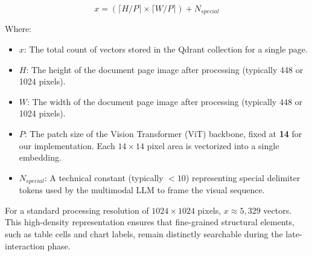 \begin{equation}
    x = \left( \lceil H / P \rceil \times \lceil W / P \rceil \right) + N_{special}
\end{equation}

Where:
\begin{itemize}
    \item \textbf{$x$}: The total count of vectors stored in the Qdrant collection for a single page.
    \item \textbf{$H$}: The height of the document page image after processing (typically 448 or 1024 pixels).
    \item \textbf{$W$}: The width of the document page image after processing (typically 448 or 1024 pixels).
    \item \textbf{$P$}: The patch size of the Vision Transformer (ViT) backbone, fixed at \textbf{14} for our implementation. Each $14 \times 14$ pixel area is vectorized into a single embedding.
    \item \textbf{$N_{special}$}: A technical constant (typically $< 10$) representing special delimiter tokens used by the multimodal LLM to frame the visual sequence.
\end{itemize}

For a standard processing resolution of $1024 \times 1024$ pixels, $x \approx 5,329$ vectors. This high-density representation ensures that fine-grained structural elements, such as table cells and chart labels, remain distinctly searchable during the late-interaction phase.

